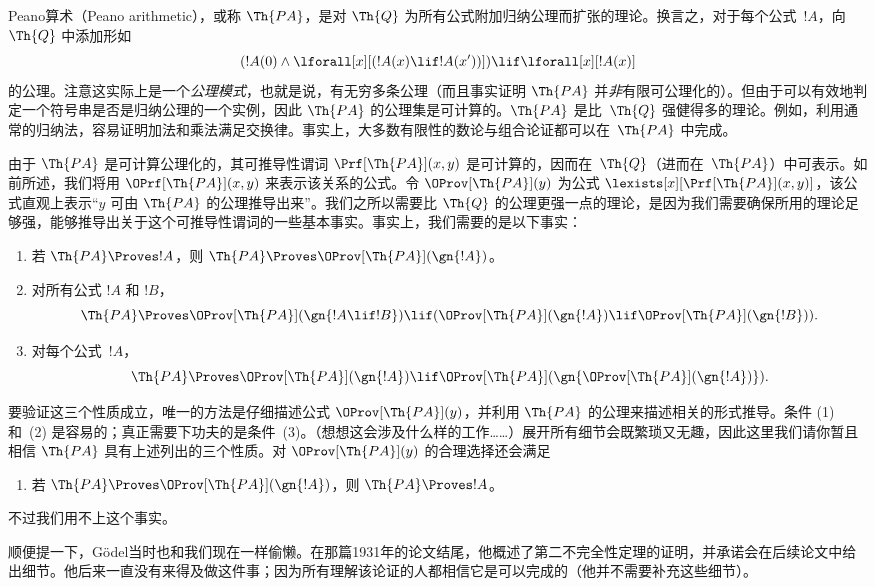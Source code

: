 \documentclass[../../../include/open-logic-section]{subfiles}
\begin{document}


Peano算术（Peano arithmetic），或称 $\Th{PA}$，是对 $\Th{Q}$ 为所有公式附加归纳公理而扩张的理论。换言之，对于每个公式~$!A$，向 $\Th{Q}$ 中添加形如
\[
(!A(0) \land \lforall[x][(!A(x) \lif !A(x'))]) \lif \lforall[x][!A(x)]
\]
的公理。注意这实际上是一个\emph{公理模式}，也就是说，有无穷多条公理（而且事实证明 $\Th{PA}$ 并\emph{非}有限可公理化的）。但由于可以有效地判定一个符号串是否是归纳公理的一个实例，因此 $\Th{PA}$ 的公理集是可计算的。$\Th{PA}$ 是比~$\Th{Q}$ 强健得多的理论。例如，利用通常的归纳法，容易证明加法和乘法满足交换律。事实上，大多数有限性的数论与组合论证都可以在~$\Th{PA}$ 中完成。

由于 $\Th{PA}$ 是可计算公理化的，其可推导性谓词 $\Prf[\Th{PA}](x,y)$ 是可计算的，因而在~$\Th{Q}$（进而在~$\Th{PA}$）中可表示。如前所述，我们将用 $\OPrf[\Th{PA}](x,y)$ 来表示该关系的公式。令 $\OProv[\Th{PA}](y)$ 为公式 $\lexists[x][\Prf[\Th{PA}](x,y)]$，该公式直观上表示“$y$ 可由 $\Th{PA}$ 的公理推导出来”。我们之所以需要比 $\Th{Q}$ 的公理更强一点的理论，是因为我们需要确保所用的理论足够强，能够推导出关于这个可推导性谓词的一些基本事实。事实上，我们需要的是以下事实：

\begin{enumerate}
\item[P1.] 若 $\Th{PA} \Proves !A$，则 $\Th{PA} \Proves
  \OProv[\Th{PA}](\gn{!A})$。
\item[P2.] 对所有公式 $!A$ 和 $!B$，
  \[
  \Th{PA} \Proves \OProv[\Th{PA}](\gn{!A \lif !B}) \lif
  (\OProv[\Th{PA}](\gn{!A}) \lif \OProv[\Th{PA}](\gn{!B})).
  \]
\item[P3.] 对每个公式~$!A$，
  \[
  \Th{PA} \Proves \OProv[\Th{PA}](\gn{!A})
  \lif \OProv[\Th{PA}](\gn{\OProv[\Th{PA}](\gn{!A})}).
  \]
\end{enumerate}

要验证这三个性质成立，唯一的方法是仔细描述公式 $\OProv[\Th{PA}](y)$，并利用 $\Th{PA}$ 的公理来描述相关的形式推导。条件 (1) 和~(2) 是容易的；真正需要下功夫的是条件~(3)。（想想这会涉及什么样的工作……）展开所有细节会既繁琐又无趣，因此这里我们请你暂且相信 $\Th{PA}$ 具有上述列出的三个性质。对 $\OProv[\Th{PA}](y)$ 的合理选择还会满足

\begin{enumerate}
\item[P4.] 若 $\Th{PA} \Proves \OProv[\Th{PA}](\gn{!A})$，则
  $\Th{PA} \Proves !A$。
\end{enumerate}

不过我们用不上这个事实。

\begin{digress}
顺便提一下，Gödel当时也和我们现在一样偷懒。在那篇1931年的论文结尾，他概述了第二不完全性定理的证明，并承诺会在后续论文中给出细节。他后来一直没有来得及做这件事；因为所有理解该论证的人都相信它是可以完成的（他并不需要补充这些细节）。
\end{digress}
\end{document}
